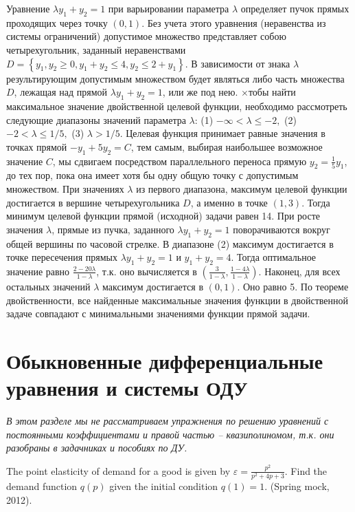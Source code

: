 \begin{solution}
Уравнение $\lambda y_{1} +y_{2} =1$ при варьировании параметра $\lambda $ определяет пучок прямых проходящих через точку $(0,1)$. Без учета этого уравнения (неравенства из системы ограничений) допустимое множество представляет собою четырехугольник, заданный неравенствами $D=\left\{y_{1} ,y_{2} \ge 0,y_{1} +y_{2} \le 4,y_{2} \le 2+y_{1} \right\}$. В зависимости от знака $\lambda $ результирующим допустимым множеством будет являться либо часть множества $D$, лежащая над прямой $\lambda y_{1} +y_{2} =1$, или же под нею. $\times$тобы найти максимальное значение двойственной целевой функции, необходимо рассмотреть следующие диапазоны значений параметра $\lambda $: (1) $-\infty <\lambda \le -2,$ (2) $-2<\lambda \le 1/5,$ (3) $\lambda >1/5.$ Целевая функция принимает равные значения в точках прямой $-y_{1} +5y_{2} =C$, тем самым, выбирая наибольшее возможное значение $C$, мы сдвигаем посредством параллельного переноса прямую $y_{2} =\frac{1}{5} y_{1} $, до тех пор, пока она имеет хотя бы одну общую точку с допустимым множеством. При значениях $\lambda $ из первого диапазона, максимум целевой функции достигается в вершине четырехугольника $D$, а именно в точке $(1,3)$. Тогда минимум целевой функции прямой (исходной) задачи равен 14. При росте значения $\lambda $, прямые из пучка, заданного $\lambda y_{1} +y_{2} =1$ поворачиваются вокруг общей вершины по часовой стрелке. В диапазоне (2) максимум достигается в точке пересечения прямых $\lambda y_{1} +y_{2} =1$ и $y_{1} +y_{2} =4$. Тогда оптимальное значение  равно $\frac{2-20\lambda }{1-\lambda } $, т.к. оно вычисляется в $(\frac{3}{1-\lambda } ,  \frac{1-4\lambda }{1-\lambda } )$. Наконец, для всех остальных значений $\lambda $ максимум достигается в $(0,1).$ Оно равно 5. По теореме двойственности, все найденные максимальные значения функции в двойственной задаче совпадают с минимальными значениями функции прямой задачи.
\end{solution}


\section{Обыкновенные дифференциальные уравнения и системы ОДУ}

\textit{В этом разделе мы не рассматриваем упражнения по решению уравнений с постоянными коэффициентами и правой частью -- квазиполиномом, т.к. они разобраны в задачниках и пособиях по ДУ.}

\begin{problem}
The point elasticity of demand for a good is given by $\varepsilon =\frac{p^{2} }{p^{2} +4p+3} $. Find the demand function $q(p)$ given the initial condition $q(1)=1$. (Spring mock, 2012).
\end{problem}


